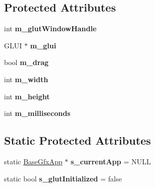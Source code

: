 \subsection*{Protected Attributes}
\begin{DoxyCompactItemize}
\item 
\hypertarget{classBaseGfxApp_ad8697d6fdd10e6f336c3a662016b4fa7}{int {\bfseries m\-\_\-glut\-Window\-Handle}}\label{classBaseGfxApp_ad8697d6fdd10e6f336c3a662016b4fa7}

\item 
\hypertarget{classBaseGfxApp_a6eb1673b80283727221da2242211af1d}{G\-L\-U\-I $\ast$ {\bfseries m\-\_\-glui}}\label{classBaseGfxApp_a6eb1673b80283727221da2242211af1d}

\item 
\hypertarget{classBaseGfxApp_a2e70a389224f8affe7c137f7e20dc8c1}{bool {\bfseries m\-\_\-drag}}\label{classBaseGfxApp_a2e70a389224f8affe7c137f7e20dc8c1}

\item 
\hypertarget{classBaseGfxApp_a7e5ef1c8f25fe081b4a1fd4ce6a96e07}{int {\bfseries m\-\_\-width}}\label{classBaseGfxApp_a7e5ef1c8f25fe081b4a1fd4ce6a96e07}

\item 
\hypertarget{classBaseGfxApp_ac078e4fc20b5c2fe0c744966b850b412}{int {\bfseries m\-\_\-height}}\label{classBaseGfxApp_ac078e4fc20b5c2fe0c744966b850b412}

\item 
\hypertarget{classBaseGfxApp_a72e7753eb311a758240ef4998e7130c8}{int {\bfseries m\-\_\-milliseconds}}\label{classBaseGfxApp_a72e7753eb311a758240ef4998e7130c8}

\end{DoxyCompactItemize}
\subsection*{Static Protected Attributes}
\begin{DoxyCompactItemize}
\item 
\hypertarget{classBaseGfxApp_a65ba89b98af31e2649a0546631931000}{static \hyperlink{classBaseGfxApp}{Base\-Gfx\-App} $\ast$ {\bfseries s\-\_\-current\-App} = N\-U\-L\-L}\label{classBaseGfxApp_a65ba89b98af31e2649a0546631931000}

\item 
\hypertarget{classBaseGfxApp_afa4690383ea27713016ef75b9fb1e42f}{static bool {\bfseries s\-\_\-glut\-Initialized} = false}\label{classBaseGfxApp_afa4690383ea27713016ef75b9fb1e42f}

\end{DoxyCompactItemize}


